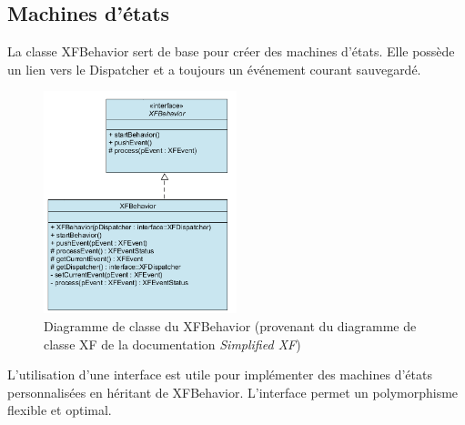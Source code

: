 \subsection{Machines d'états}
La classe XFBehavior sert de base pour créer des machines d'états. Elle possède un lien
vers le Dispatcher et a toujours un événement courant sauvegardé.
\begin{figure}[H]
    \centering
    \includegraphics[width=0.5\textwidth]{Images/xf/XFBehavior.PNG}
    \caption[Diagramme de classe du XFBehavior]{Diagramme de classe du XFBehavior
    (provenant du diagramme de classe XF de la documentation
    \emph{Simplified XF}\footnotemark[1])}
\end{figure}
L'utilisation d'une interface est utile pour implémenter des machines d'états personnalisées
en héritant de XFBehavior. L'interface permet un polymorphisme flexible et optimal.\newpage


